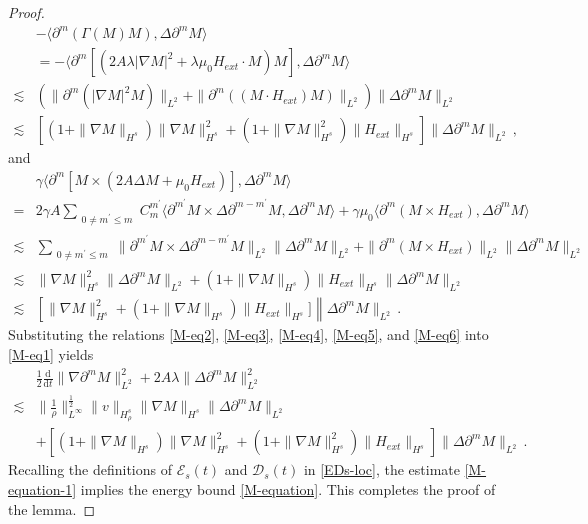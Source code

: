 \documentclass[reqno,11pt]{amsart}
\numberwithin{equation}{section}
\def\p{\partial}
\def\d{\mathrm{d}}
\begin{document}
\begin{proof}
\begin{equation}
\begin{aligned}
&-\langle \partial^m (\Gamma(M) M), \Delta \partial^m M \rangle \\& = -\langle \partial^m \left[ (2A\lambda|\nabla M|^2 + \lambda\mu_0 H_{ext} \cdot M) M \right], \Delta \partial^m M \rangle \\
\lesssim & \left( \|\partial^m (|\nabla M|^2 M)\|_{L^2} + \|\partial^m ((M \cdot H_{ext}) M)\|_{L^2} \right) \|\Delta \partial^m M\|_{L^2} \\
\lesssim & \left[ (1 + \|\nabla M\|_{H^s}) \|\nabla M\|_{H^s}^2 + (1 + \|\nabla M\|_{H^s}^2) \|H_{ext}\|_{H^s} \right] \|\Delta \partial^m M\|_{L^2} \,,
	\end{aligned}
\end{equation}
and
\begin{equation}\label{M-eq6}
	\begin{aligned}
&\gamma \langle \partial^m \left[ M \times (2A\Delta M + \mu_0 H_{ext}) \right], \Delta \partial^m M \rangle  \\
= & 2\gamma A\sum_{\substack{0 \neq m^{\prime}\leq m}} C_m^{m^{\prime}} \langle \partial^{m^{\prime}} M \times \Delta \partial^{m-m^{\prime}} M, \Delta \partial^m M \rangle + \gamma\mu_0 \langle \partial^m (M \times H_{ext}), \Delta \partial^m M \rangle \\
\lesssim & \sum_{\substack{0 \neq  m^{\prime}\leq m}} \|\partial^{ m^{\prime}} M \times \Delta \partial^{m- m^{\prime}} M\|_{L^2} \|\Delta \partial^m M\|_{L^2} +\|\partial^m (M \times H_{ext})\|_{L^2} \|\Delta \partial^m M\|_{L^2} \\
\lesssim & \|\nabla M\|_{H^s}^2 \|\Delta \partial^m M\|_{L^2}
+ (1 + \|\nabla M\|_{H^s}) \|H_{ext}\|_{H^s} \|\Delta \partial^m M\|_{L^2}\\
\lesssim & \left[\|\nabla M\|_{H^s}^2+(1 + \|\nabla M\|_{H^s}) \|H_{ext}\|_{H^s}]\right \|\Delta \partial^m M\|_{L^2} \,.
	\end{aligned}
\end{equation}
Substituting the relations \eqref{M-eq2}, \eqref{M-eq3}, \eqref{M-eq4}, \eqref{M-eq5}, and \eqref{M-eq6} into \eqref{M-eq1} yields
\begin{equation}\label{M-equation-1}
	\begin{aligned}
&\frac{1}{2}\frac{\d}{\d t}\|\nabla\p^m M\|^2_{L^2}+2A\lambda\|\Delta\p^m M\|^2_{L^2}\\
\lesssim & \|\frac{1}{\rho}\|^{\frac{1}{2}}_{L^\infty}\|v\|_{H^s_\rho}\|\nabla M\|_{H^s}\|\Delta\p^m M\|_{L^2}\\
& +\left[(1+\|\nabla M\|_{H^s})\|\nabla M\|_{H^s}^2 + (1+\|\nabla M\|_{H^s}^2)\|H_{ext}\|_{H^s}\right]\|\Delta\partial^mM\|_{L^2} \,.
	\end{aligned}
\end{equation}
Recalling the definitions of $\mathcal{E}_s(t)$ and $\mathcal{D}_s(t)$ in \eqref{EDs-loc}, the estimate \eqref{M-equation-1} implies the energy bound \eqref{M-equation}. This completes the proof of the lemma.
\end{proof}
\end{document}
